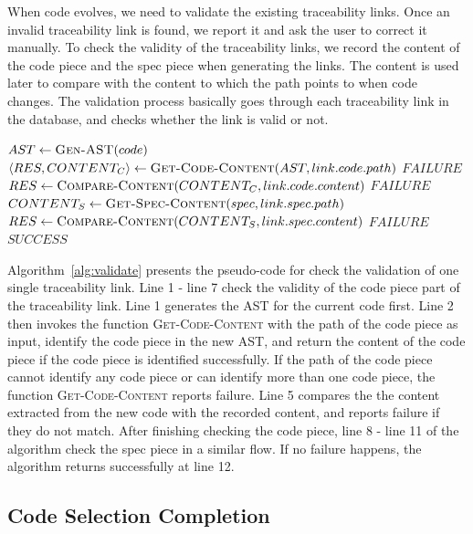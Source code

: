When code evolves, we need to validate the existing traceability links.
Once an invalid traceability link is found, we report it and ask the user to correct it manually.
To check the validity of the traceability links, we record the content of the code piece and the spec piece when generating the links.
The content is used later to compare with the content to which the path points to when code changes.
The validation process basically goes through each traceability link in the database,
and checks whether the link is valid or not.
\begin{algorithm}[!h]
\DontPrintSemicolon
{}
$AST \leftarrow \textsc{Gen-AST}(code)$\;
$\langle RES, CONTENT_C \rangle \leftarrow \textsc{Get-Code-Content}(AST, link.code.path)$\;
 {
\Return $FAILURE$\;
}
$RES \leftarrow \textsc{Compare-Content}(CONTENT_C, link.code.content)$\;
 {
\Return $FAILURE$\;
}
$CONTENT_S \leftarrow \textsc{Get-Spec-Content}(spec, link.spec.path)$\;
$RES \leftarrow \textsc{Compare-Content}(CONTENT_S, link.spec.content)$\;
 {
\Return $FAILURE$\;
}
\Return $SUCCESS$\;
\caption{$\textsc{Traceability-Link-Validation}(link)$}
\label{alg:validate}
\end{algorithm}
Algorithm~\ref{alg:validate} presents the pseudo-code for check the validation of one single traceability link.
Line 1 - line 7 check the validity of the code piece part of the traceability link.
Line 1 generates the AST for the current code first.
Line 2 then invokes the function \textsc{Get-Code-Content} with the path of the code piece as input, identify the code piece in the new AST, and return the content of the code piece if the code piece is identified successfully.
If the path of the code piece cannot identify any code piece or can identify more than one code piece, the function \textsc{Get-Code-Content} reports failure.
Line 5 compares the the content extracted from the new code with the recorded content, and reports failure if they do not match.
After finishing checking the code piece, line 8 - line 11 of the algorithm check the spec piece in a similar flow.
If no failure happens, the algorithm returns successfully at line 12.


\subsection{Code Selection Completion}

